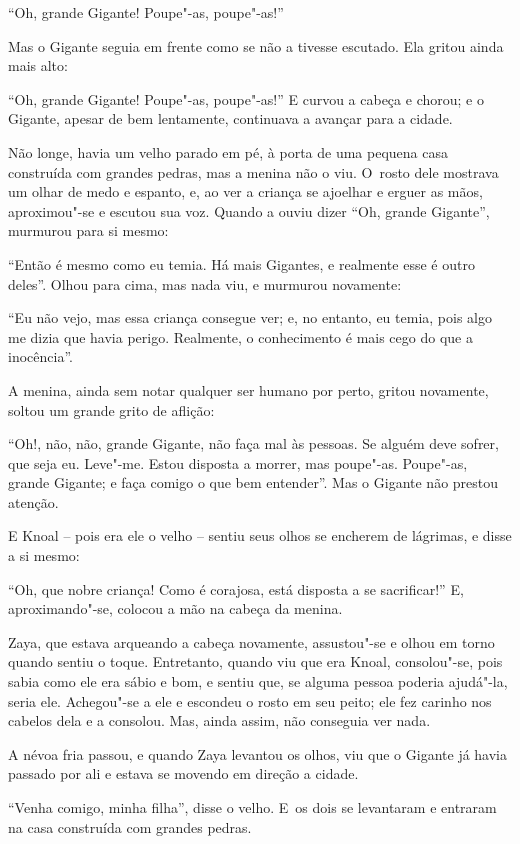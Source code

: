 ``Oh, grande Gigante! Poupe"-as, poupe"-as!''

Mas o Gigante seguia em frente como se não a tivesse escutado. Ela
gritou ainda mais alto:

``Oh, grande Gigante! Poupe"-as, poupe"-as!'' E curvou a cabeça e chorou;
e o Gigante, apesar de bem lentamente, continuava a avançar para a
cidade.

Não longe, havia um velho parado em pé, à porta de uma pequena casa
construída com grandes pedras, mas a menina não o viu. O~rosto dele
mostrava um olhar de medo e espanto, e, ao ver a criança se ajoelhar e
erguer as mãos, aproximou"-se e escutou sua voz. Quando a ouviu dizer
``Oh, grande Gigante'', murmurou para si mesmo:

``Então é mesmo como eu temia. Há mais Gigantes, e realmente esse é
outro deles''. Olhou para cima, mas nada viu, e murmurou novamente:

``Eu não vejo, mas essa criança consegue ver; e, no entanto, eu temia,
pois algo me dizia que havia perigo. Realmente, o conhecimento é mais
cego do que a inocência''.

A menina, ainda sem notar qualquer ser humano por perto, gritou
novamente, soltou um grande grito de aflição:

``Oh!, não, não, grande Gigante, não faça mal às pessoas. Se alguém deve
sofrer, que seja eu. Leve"-me. Estou disposta a morrer, mas poupe"-as.
Poupe"-as, grande Gigante; e faça comigo o que bem entender''. Mas o
Gigante não prestou atenção.

E Knoal -- pois era ele o velho -- sentiu seus olhos se encherem de
lágrimas, e disse a si mesmo:

``Oh, que nobre criança! Como é corajosa, está disposta a se
sacrificar!'' E, aproximando"-se, colocou a mão na cabeça da menina.

Zaya, que estava arqueando a cabeça novamente, assustou"-se e olhou em
torno quando sentiu o toque. Entretanto, quando viu que era Knoal,
consolou"-se, pois sabia como ele era sábio e bom, e sentiu que, se
alguma pessoa poderia ajudá"-la, seria ele. Achegou"-se a ele e escondeu o
rosto em seu peito; ele fez carinho nos cabelos dela e a consolou. Mas,
ainda assim, não conseguia ver nada.

A névoa fria passou, e quando Zaya levantou os olhos, viu que o Gigante
já havia passado por ali e estava se movendo em direção a cidade.

``Venha comigo, minha filha'', disse o velho. E~os dois se levantaram e
entraram na casa construída com grandes pedras.

